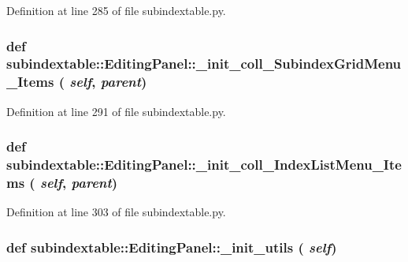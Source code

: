 Definition at line 285 of file subindextable.py.\hypertarget{classsubindextable_1_1EditingPanel_9a9885a49704cbb3c71d0ab2baa96155}{
\subsubsection[\_\-init\_\-coll\_\-SubindexGridMenu\_\-Items]{\setlength{\rightskip}{0pt plus 5cm}def subindextable::Editing\-Panel::\_\-init\_\-coll\_\-Subindex\-Grid\-Menu\_\-Items ( {\em self},  {\em parent})}}
\label{classsubindextable_1_1EditingPanel_9a9885a49704cbb3c71d0ab2baa96155}




Definition at line 291 of file subindextable.py.\hypertarget{classsubindextable_1_1EditingPanel_4492082020058408801f412abcf59320}{
\subsubsection[\_\-init\_\-coll\_\-IndexListMenu\_\-Items]{\setlength{\rightskip}{0pt plus 5cm}def subindextable::Editing\-Panel::\_\-init\_\-coll\_\-Index\-List\-Menu\_\-Items ( {\em self},  {\em parent})}}
\label{classsubindextable_1_1EditingPanel_4492082020058408801f412abcf59320}




Definition at line 303 of file subindextable.py.\hypertarget{classsubindextable_1_1EditingPanel_ad72ddfcc90a6d851466d24a9070e9d2}{
\subsubsection[\_\-init\_\-utils]{\setlength{\rightskip}{0pt plus 5cm}def subindextable::Editing\-Panel::\_\-init\_\-utils ( {\em self})}}
\label{classsubindextable_1_1EditingPanel_ad72ddfcc90a6d851466d24a9070e9d2}




